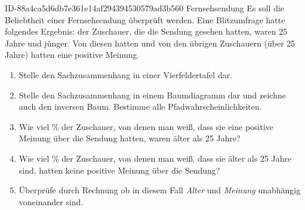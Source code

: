 \begin{exercise}
      {ID-88a4ca5d6db7e361e14af294394530579ad3b560}
      {Fernsehsendung}
  \ifproblem\problem
    Es soll die Beliebtheit einer Fernsehsendung überprüft werden.
    Eine Blitzumfrage hatte folgendes Ergebnis:  der Zuschauer,
    die die Sendung gesehen hatten, waren 25 Jahre und jünger.
    Von diesen hatten  und von den übrigen Zuschauern (über 25 Jahre)
    hatten  eine positive Meinung.
    \begin{enumerate}
      \item Stelle den Sachzusammenhang in einer Vierfeldertafel dar.
      \item Stelle den Sachzusammenhang in einem Baumdiagramm dar und zeichne
            auch den inversen Baum. Bestimme alle Pfadwahrscheinlichkeiten.
      \item Wie viel \% der Zuschauer, von denen man weiß, dass sie eine
            positive Meinung über die Sendung hatten, waren älter als 25 Jahre?
      \item Wie viel \% der Zuschauer, von denen man weiß, dass sie älter als
            25 Jahre sind, hatten keine positive Meinung über die Sendung?
      \item Überprüfe durch Rechnung ob in diesem Fall \textit{Alter} und
            \textit{Meinung} unabhängig voneinander sind.
    \end{enumerate}
  \fi
\end{exercise}
